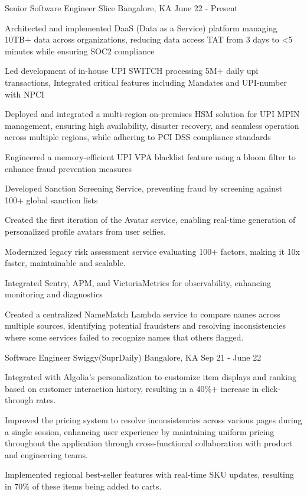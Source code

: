 \begin{cventries}
  \cventry
    {Senior Software Engineer}
    {Slice}
    {Bangalore, KA}
    {June 22 - Present}
    {
      \begin{cvitems}
        \item {Architected and implemented DaaS (Data as a Service) platform managing 10TB+ data across organizations,
        reducing data access TAT from 3 days to <5 minutes while ensuring SOC2 compliance}
        \item {Led development of in-house UPI SWITCH processing 5M+ daily upi transactions, Integrated critical features including Mandates and UPI-number with NPCI}
        \item {Deployed and integrated a multi-region on-premises HSM solution for UPI MPIN management, ensuring high availability,
        disaster recovery, and seamless operation across multiple regions, while adhering to PCI DSS compliance standards}
        \item {Engineered a memory-efficient UPI VPA blacklist feature using a bloom filter to enhance fraud prevention measures}
        \item {Developed Sanction Screening Service, preventing fraud by screening against 100+ global sanction lists}
        \item {Created the first iteration of the Avatar service, enabling real-time generation of personalized profile avatars from user selfies.}
        \item {Modernized legacy risk assessment service evaluating 100+ factors, making it 10x faster, maintainable and scalable.}
        \item {Integrated Sentry, APM, and VictoriaMetrics for observability, enhancing monitoring and diagnostics}
        \item {Created a centralized NameMatch Lambda service to compare names across multiple sources,
          identifying potential fraudsters and resolving inconsistencies where some services failed to recognize names that others flagged.}
      \end{cvitems}
    }
  
  \cventry
    {Software Engineer}
    {Swiggy(SuprDaily)}
    {Bangalore, KA}
    {Sep 21 - June 22}
    {
      \begin{cvitems}
        \item {Integrated with Algolia's personalization to customize item displays and ranking based on customer interaction history, resulting in a 40\%+ increase in click-through rates.}
        \item {Improved the pricing system to resolve inconsistencies across various pages during a single session,
          enhancing user experience by maintaining uniform pricing throughout the application through
          cross-functional collaboration with product and engineering teams.}
        \item {Implemented regional best-seller features with real-time SKU updates, resulting in 70\% of these items being added to carts.}
      \end{cvitems}
    }
  

\end{cventries}
